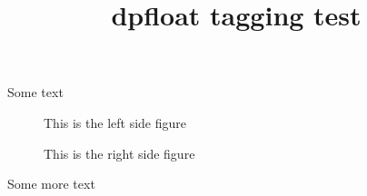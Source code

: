 \documentclass{article}
\title{dpfloat tagging test}
\begin{document}
Some text
\begin{figure}[p]%
\begin{leftfullpage}
This is the left side figure
\end{leftfullpage}
\end{figure}
\begin{figure}[p]%
\begin{fullpage}
This is the right side figure
\end{fullpage}
\end{figure}
Some more text
\end{document}
